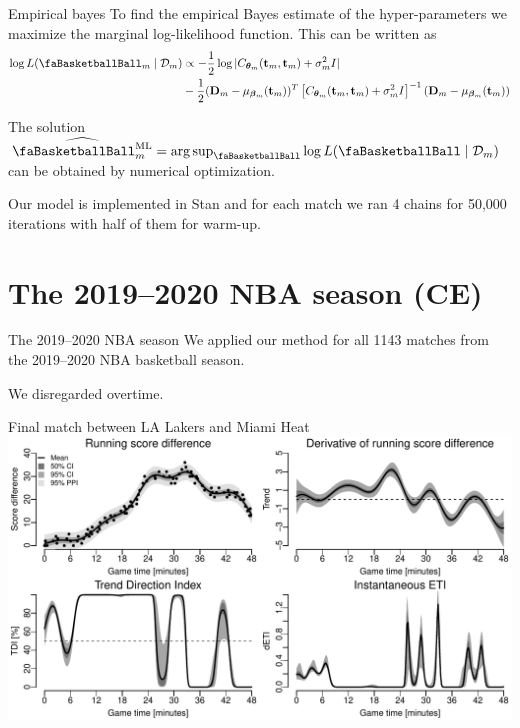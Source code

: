 \documentclass[ignorenonframetext,xcolor=pdflatex,table,dvipsnames,serif]{beamer}
\newcommand{\BTheta}{\text{\faBasketballBall}}
\DeclareMathOperator*{\argsup}{arg\,sup}
\begin{document}
\begin{frame}{Empirical bayes}
To find the empirical Bayes estimate of the hyper-parameters we maximize the marginal log-likelihood function. This can be written as
{
\footnotesize
\begin{align*}
\log L(\BTheta_m \mid \mathcal{D}_m) &\propto - \frac{1}{2}\log |C_{\bm{\theta}_m}(\mathbf{t}_m, \mathbf{t}_m) + \sigma_m^2 I|\\
&- \frac{1}{2}(\mathbf{D}_m - \mu_{\bm{\beta}_m}(\mathbf{t}_m))^T\left[C_{\bm{\theta}_m}(\mathbf{t}_m, \mathbf{t}_m) + \sigma_m^2 I\right]^{-1}(\mathbf{D}_m - \mu_{\bm{\beta}_m}(\mathbf{t}_m))
\end{align*}	
} 

The solution $\widehat{\BTheta_m^\text{ML}} = \argsup_{\BTheta} \log L(\BTheta \mid \mathcal{D}_m)$ can be obtained by numerical optimization.

Our model is implemented in Stan and for each match we ran 4 chains for 50,000 iterations with half of them for warm-up. 
\end{frame}


\section{The 2019--2020 NBA season (CE)}

\begin{frame}{The 2019--2020 NBA season}
We applied our method for all 1143 matches from the 2019--2020 NBA basketball season.

We disregarded overtime.
\end{frame}

\begin{frame}{Final match between LA Lakers and Miami Heat}
\includegraphics[scale=0.5]{fig2.pdf}
\end{frame}
\end{document}
